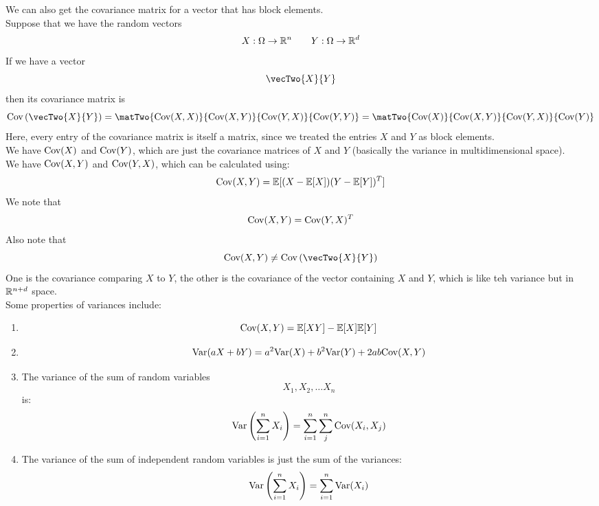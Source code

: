 \documentclass[12pt]{article}
\begin{document}
    We can also get the covariance
    matrix for a vector that has
    block elements. \\
    Suppose that we have the random vectors
    \[ X: \Omega \to \mathbb{R}^n
    \qquad Y: \Omega \to \mathbb{R}^d \]
    If we have a vector
    \[ \vecTwo{X}{Y} \]
    then its covariance matrix is
    \[ \cov\para{\vecTwo{X}{Y}}
    = \matTwo{\cov(X, X)}{\cov(X, Y)}
    {\cov(Y, X)}{\cov(Y, Y)}
    = \matTwo{\cov(X)}{\cov(X, Y)}
    {\cov(Y, X)}{\cov(Y)} \]
    Here, every entry of the covariance
    matrix is itself a matrix,
    since we treated the entries
    $X$ and $Y$ as block elements. \\
    We have $\text{Cov}(X)$ and $\text{Cov}(Y)$,
    which are just the covariance 
    matrices of $X$ and $Y$
    (basically the variance in
    multidimensional space). \\
    We have $\text{Cov}(X, Y)$
    and $\text{Cov}(Y, X)$,
    which can be calculated
    using:
    \[ \text{Cov}(X, Y) = 
    \mathbb{E}[(X - \mathbb{E}[X])(Y - \mathbb{E}[Y])^T] \]
    We note that
    \[ \text{Cov}(X, Y) = 
    \text{Cov}(Y, X)^T \]
    Also note that
    \[ \cov(X, Y) \neq 
    \cov\para{\vecTwo{X}{Y}} \]
    One is the covariance comparing
    $X$ to $Y$,
    the other is the covariance of the
    vector containing $X$ and $Y$,
    which is like teh variance but in
    $\mathbb{R}^{n + d}$ space. \\

    Some properties of variances include:
    \begin{enumerate}
        \item 
        \[ \text{Cov}(X, Y) = \mathbb{E}[XY] - \mathbb{E}[X]\mathbb{E}[Y] \]
        \item
        \[ \text{Var}(aX + bY)
        = a^2\text{Var}(X) + b^2\text{Var}(Y)
        + 2ab\text{Cov}(X, Y) \]
        \item
        The variance of the sum
        of random variables
        \[ X_1, X_2, \dots X_n \]
        is:
        \[ \text{Var}\left( \sum_{i=1}^{n}X_i \right)
        = \sum_{i=1}^{n}\sum_{j}^{n}
        \text{Cov}(X_i, X_j) \]
        \item
        The variance of the sum of
        independent random variables is
        just the sum of the variances:
        \[ \text{Var}\left( \sum_{i=1}^{n}X_i \right)
        = \sum_{i=1}^{n} \text{Var}(X_i) \] \\
    \end{enumerate}
\end{document}

